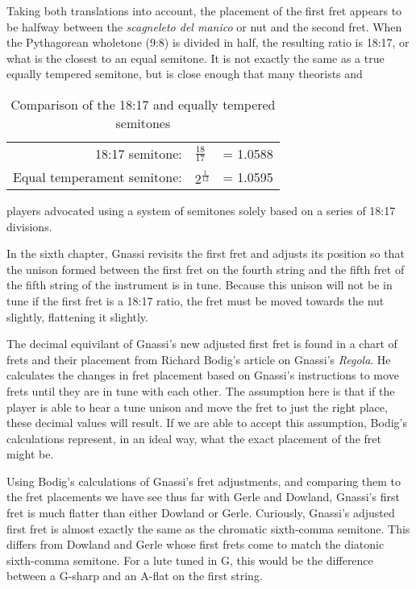 Taking both translations into account, the placement of
the first fret appears to be halfway between the \textit{scagneleto del manico} or nut and the
second fret.  When the Pythagorean wholetone (9:8) is divided in half, the resulting ratio is
18:17, or what is the closest to an equal semitone.  It is not exactly the same
as a true equally tempered semitone, but is close enough that many theorists and
\begin{table}[h!]
    \begin{center}
    \begin{tabular}{ r l l }
        18:17 semitone:             & $ \frac{18}{17}  $ & = 1.0588 \\
        Equal temperament semitone: & $ 2^\frac{1}{12} $ & = 1.0595 \\
    \end{tabular}
    \end{center}
    \caption{Comparison of the 18:17 and equally tempered semitones}
\end{table}
players advocated using a system of semitones solely based on a series of 18:17
divisions.

In the sixth chapter, Gnassi revisits the first fret and adjusts
its position so that the unison formed between the first fret on the fourth string and the fifth fret
of the fifth string of the instrument is in tune.\autocite[67]{RB:3}  Because this unison will not be
in tune if the first fret is a 18:17 ratio, the fret must be moved towards the nut slightly, flattening
it slightly.

The decimal equivilant of Gnassi's new adjusted first fret is found in a chart of frets and
their placement from Richard Bodig's article on Gnassi's \textit{Regola}.  He calculates the
changes in fret placement based on Gnassi's instructions to move frets until they are in tune
with each other.  The assumption here is that if the player is able to hear a tune unison and
move the fret to just the right place, these decimal values will result.  If we are able to
accept this assumption, Bodig's calculations represent, in an ideal way, what the exact
placement of the fret might be.

Using Bodig's calculations of Gnassi's fret adjustments, and comparing them to the fret
placements we have see thus far with Gerle and Dowland, Gnassi's first fret is much flatter
than either Dowland or Gerle.  Curiously, Gnassi's adjusted first fret is almost exactly
the same as the chromatic sixth-comma semitone.  This differs from Dowland and Gerle whose
first frets come to match the diatonic sixth-comma semitone.  For a lute tuned in G,
this would be the difference between a G-sharp and an A-flat on the first string.

